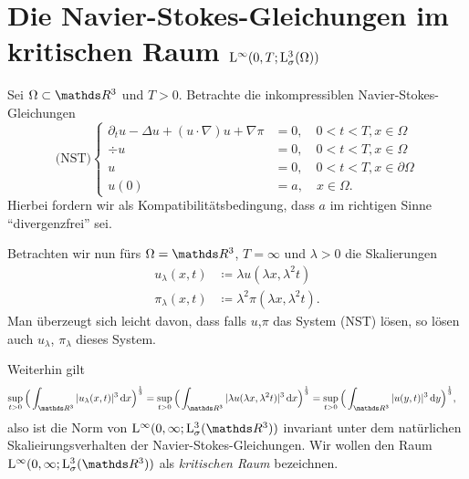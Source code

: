 \chapter{Die Navier-Stokes-Gleichungen im kritischen Raum $\mathrm{L}^\infty(0,T; \mathrm{L}^3_\sigma(\Omega))$}

Sei $\Omega \subset \R^3$ und $T > 0$.
Betrachte die inkompressiblen Navier-Stokes-Gleichungen
$$
\text{(NST)} \begin{cases}
  \partial_t u - \Delta u + (u \cdot \nabla) u + \nabla \pi &= 0, \quad 0 < t < T, x \in \Omega \\
  \div u &= 0, \quad 0 < t < T, x \in \Omega \\
  u &= 0, \quad 0 < t < T, x \in \partial\Omega \\
  u(0) &= a, \quad x \in \Omega.
\end{cases}
$$
Hierbei fordern wir als Kompatibilitätsbedingung, dass $a$ im richtigen Sinne ``divergenzfrei'' sei.

Betrachten wir nun fürs $\Omega = \R^3$, $T = \infty$ und $\lambda > 0$ die Skalierungen
\begin{align*}
  u_\lambda(x,t)  &\coloneqq \lambda u(\lambda x, \lambda^2 t) \\
  \pi_\lambda(x,t) &\coloneqq \lambda^2 \pi(\lambda x, \lambda^2 t).
\end{align*}
Man überzeugt sich leicht davon, dass falls $u$,$\pi$ das System (NST) lösen, so lösen auch $u_\lambda$, $\pi_\lambda$ dieses System.

Weiterhin gilt
\begin{align*}
  \sup_{t > 0} \Big( \int_{\R^3} |u_\lambda(x,t)|^3 \d x \Big)^{\frac{1}{3}} 
  &= \sup_{t > 0} \Big( \int_{\R^3} |\lambda u (\lambda x, \lambda^2 t) |^3 \d x \Big)^{\frac{1}{3}} 
  = \sup_{t > 0} \Big( \int_{\R^3} |u(y,t)|^3 \d y \Big)^{\frac{1}{3}},
  \end{align*}
also ist die Norm von $\Ell^\infty(0,\infty; \Ell_\sigma^3(\R^3))$ invariant unter dem natürlichen Skalieirungsverhalten der Navier-Stokes-Gleichungen.
Wir wollen den Raum $\Ell^\infty(0,\infty; \Ell^3_\sigma(\R^3))$ als \emph{kritischen Raum} bezeichnen.

